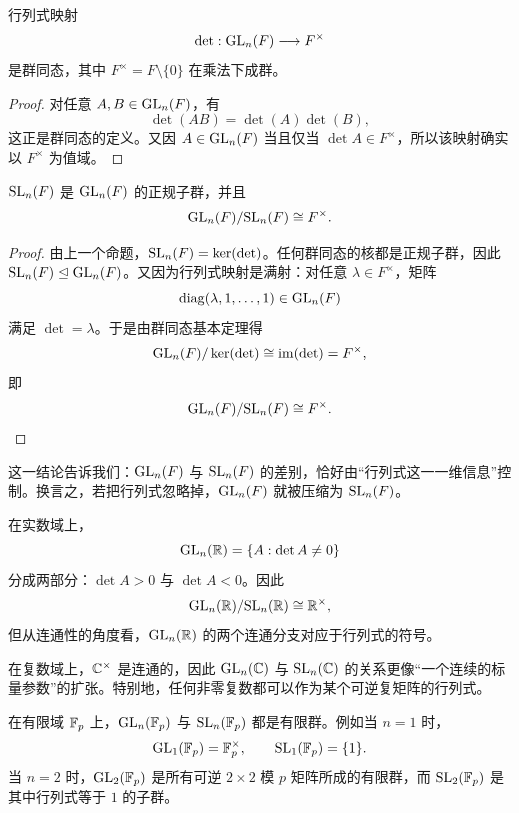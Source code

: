 \begin{proposition}
行列式映射
\[
\det:\mathrm{GL}_n(F)\longrightarrow F^\times
\]
是群同态，其中 $F^\times=F\setminus\{0\}$ 在乘法下成群。
\end{proposition}

\begin{proof}
对任意 $A,B\in \mathrm{GL}_n(F)$，有
\[
\det(AB)=\det(A)\det(B),
\]
这正是群同态的定义。又因 $A\in \mathrm{GL}_n(F)$ 当且仅当 $\det A\in F^\times$，所以该映射确实以 $F^\times$ 为值域。
\end{proof}

\begin{theorem}
$\mathrm{SL}_n(F)$ 是 $\mathrm{GL}_n(F)$ 的正规子群，并且
\[
\mathrm{GL}_n(F)/\mathrm{SL}_n(F)\cong F^\times.
\]
\end{theorem}

\begin{proof}
由上一个命题，$\mathrm{SL}_n(F)=\ker(\det)$。任何群同态的核都是正规子群，因此 $\mathrm{SL}_n(F)\trianglelefteq \mathrm{GL}_n(F)$。又因为行列式映射是满射：对任意 $\lambda\in F^\times$，矩阵
\[
\operatorname{diag}(\lambda,1,\dots,1)\in \mathrm{GL}_n(F)
\]
满足 $\det=\lambda$。于是由群同态基本定理得
\[
\mathrm{GL}_n(F)/\ker(\det)\cong \operatorname{im}(\det)=F^\times,
\]
即
\[
\mathrm{GL}_n(F)/\mathrm{SL}_n(F)\cong F^\times.
\]
\end{proof}

\begin{remark}
这一结论告诉我们：$\mathrm{GL}_n(F)$ 与 $\mathrm{SL}_n(F)$ 的差别，恰好由“行列式这一一维信息”控制。换言之，若把行列式忽略掉，$\mathrm{GL}_n(F)$ 就被压缩为 $\mathrm{SL}_n(F)$。
\end{remark}

\begin{example}
在实数域上，
\[
\mathrm{GL}_n(\mathbb{R})=\{A:\det A\ne 0\}
\]
分成两部分：$\det A>0$ 与 $\det A<0$。因此
\[
\mathrm{GL}_n(\mathbb{R})/\mathrm{SL}_n(\mathbb{R})\cong \mathbb{R}^\times,
\]
但从连通性的角度看，$\mathrm{GL}_n(\mathbb{R})$ 的两个连通分支对应于行列式的符号。
\end{example}

\begin{example}
在复数域上，$\mathbb{C}^\times$ 是连通的，因此 $\mathrm{GL}_n(\mathbb{C})$ 与 $\mathrm{SL}_n(\mathbb{C})$ 的关系更像“一个连续的标量参数”的扩张。特别地，任何非零复数都可以作为某个可逆复矩阵的行列式。
\end{example}

\begin{example}
在有限域 $\mathbb{F}_p$ 上，$\mathrm{GL}_n(\mathbb{F}_p)$ 与 $\mathrm{SL}_n(\mathbb{F}_p)$ 都是有限群。例如当 $n=1$ 时，
\[
\mathrm{GL}_1(\mathbb{F}_p)=\mathbb{F}_p^\times,
\qquad
\mathrm{SL}_1(\mathbb{F}_p)=\{1\}.
\]
当 $n=2$ 时，$\mathrm{GL}_2(\mathbb{F}_p)$ 是所有可逆 $2\times 2$ 模 $p$ 矩阵所成的有限群，而 $\mathrm{SL}_2(\mathbb{F}_p)$ 是其中行列式等于 $1$ 的子群。
\end{example}

